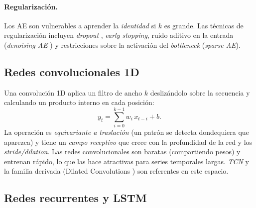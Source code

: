 \paragraph{Regularización.} Los AE son vulnerables a aprender la \emph{identidad} si $k$ es grande. Las técnicas de regularización incluyen \emph{dropout} \cite{srivastava2014dropout}, \emph{early stopping}, ruido aditivo en la entrada (\emph{denoising AE} \cite{vincent2008denoising}) y restricciones sobre la activación del \textit{bottleneck} (\emph{sparse AE}).

\subsection{Redes convolucionales 1D}

Una convolución 1D \cite{lecun1989backprop,kim2014convolutional} aplica un filtro de ancho $k$ deslizándolo sobre la secuencia y calculando un producto interno en cada posición:
\begin{equation}
y_t = \sum_{i=0}^{k-1} w_i \, x_{t-i} + b.
\label{eq:conv1d}
\end{equation}
La operación es \emph{equivariante a traslación} (un patrón se detecta dondequiera que aparezca) y tiene un \emph{campo receptivo} que crece con la profundidad de la red y los \textit{stride/dilation}. Las redes convolucionales son baratas (compartiendo pesos) y entrenan rápido, lo que las hace atractivas para series temporales largas. \emph{TCN} \cite{bai2018tcn} y la familia derivada (Dilated Convolutions \cite{oord2016wavenet}) son referentes en este espacio.

\subsection{Redes recurrentes y LSTM}

